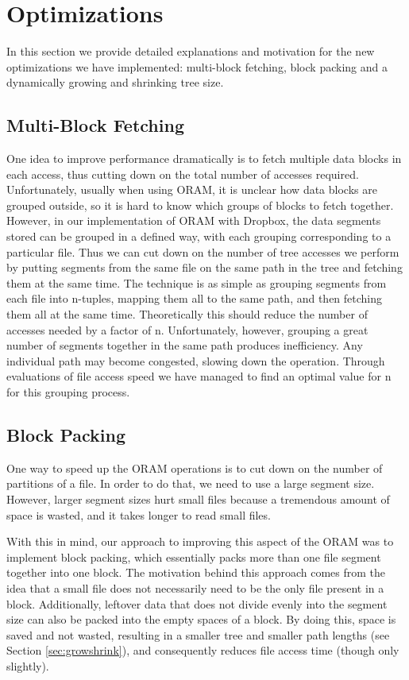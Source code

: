 \documentclass[conference]{IEEEtran}
\begin{document}
\section{Optimizations}

\label{sec:Opt}

In this section we provide detailed explanations and motivation for the new optimizations we have implemented: multi-block fetching, block packing and a dynamically growing and shrinking tree size.

\subsection{Multi-Block Fetching}

One idea to improve performance dramatically is to fetch multiple data blocks in each access, thus cutting down on the total number of accesses required. Unfortunately, usually when using ORAM, it is unclear how data blocks are grouped outside, so it is hard to know which groups of blocks to fetch together. However, in our implementation of ORAM with Dropbox, the data segments stored can be grouped in a defined way, with each grouping corresponding to a particular file. Thus we can cut down on the number of tree accesses we perform by putting segments from the same file on the same path in the tree and fetching them at the same time. The technique is as simple as grouping segments from each file into n-tuples, mapping them all to the same path, and then fetching them all at the same time. Theoretically this should reduce the number of accesses needed by a factor of n. Unfortunately, however, grouping a great number of segments together in the same path produces inefficiency. Any individual path may become congested, slowing down the operation. Through evaluations of file access speed we have managed to find an optimal value for n for this grouping process.

\subsection{Block Packing}

\label{sec:mult-blkOpt}
One way to speed up the ORAM operations is to cut down on the number of partitions of a file. In order to do that, we need to use a large segment size. However, larger segment sizes hurt small files because a tremendous amount of space is wasted, and it takes longer to read small files. 

With this in mind, our approach to improving this aspect of the ORAM was to implement block packing, which essentially packs more than one file segment together into one block. The motivation behind this approach comes from the idea that a small file does not necessarily need to be the only file present in a block. Additionally, leftover data that does not divide evenly into the segment size can also be packed into the empty spaces of a block. By doing this, space is saved and not wasted, resulting in a smaller tree and smaller path lengths (see Section \ref{sec:growshrink}), and consequently reduces file access time (though only slightly).
\end{document}
